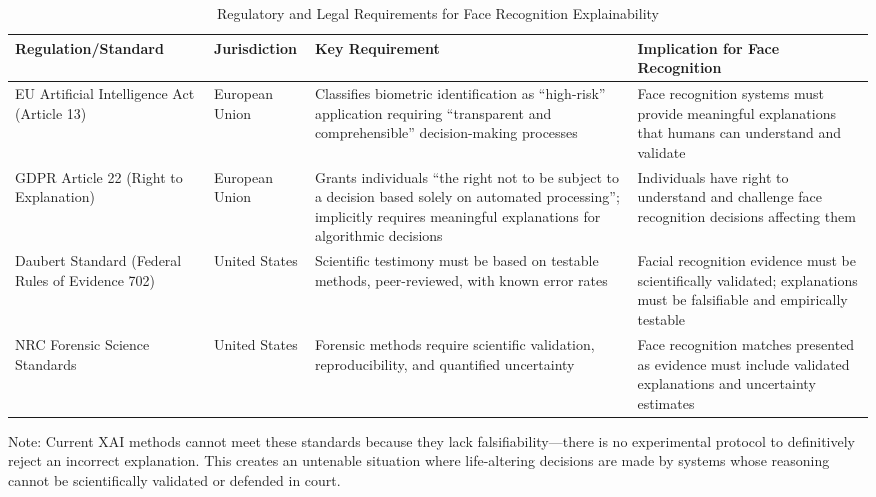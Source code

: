 
\begin{table}[htbp]
\centering
\caption{Regulatory and Legal Requirements for Face Recognition Explainability}
\label{tab:legal_requirements}
\small
\begin{tabularx}{\textwidth}{>{\raggedright\arraybackslash}p{}p{}X>{\raggedright\arraybackslash}p{}}
\toprule
\textbf{Regulation/Standard} & \textbf{Jurisdiction} & \textbf{Key Requirement} & \textbf{Implication for Face Recognition} \\
\midrule
EU Artificial Intelligence Act (Article 13) & European Union & Classifies biometric identification as ``high-risk'' application requiring ``transparent and comprehensible'' decision-making processes & Face recognition systems must provide meaningful explanations that humans can understand and validate \cite{euaiact2024} \\[8pt]

GDPR Article 22 (Right to Explanation) & European Union & Grants individuals ``the right not to be subject to a decision based solely on automated processing''; implicitly requires meaningful explanations for algorithmic decisions & Individuals have right to understand and challenge face recognition decisions affecting them \cite{gdpr2016,wachter2017right} \\[8pt]

Daubert Standard (Federal Rules of Evidence 702) & United States & Scientific testimony must be based on testable methods, peer-reviewed, with known error rates & Facial recognition evidence must be scientifically validated; explanations must be falsifiable and empirically testable \cite{daubert1993,fed702} \\[8pt]

NRC Forensic Science Standards & United States & Forensic methods require scientific validation, reproducibility, and quantified uncertainty & Face recognition matches presented as evidence must include validated explanations and uncertainty estimates \cite{nrc2009strengthening} \\
\bottomrule
\end{tabularx}
\begin{tablenotes}
\small
\item Note: Current XAI methods cannot meet these standards because they lack falsifiability---there is no experimental protocol to definitively reject an incorrect explanation. This creates an untenable situation where life-altering decisions are made by systems whose reasoning cannot be scientifically validated or defended in court.
\end{tablenotes}
\end{table}

